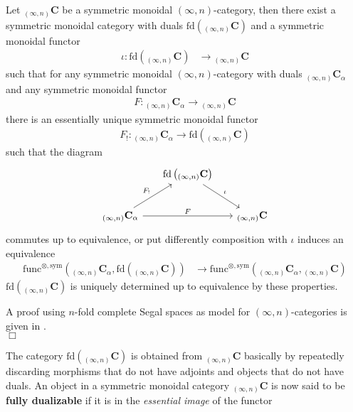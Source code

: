 \begin{thm}
\label{thm:fdsubcat}
Let ${_{(\infty,n)}}\mathbf{C}$ be a symmetric monoidal $(\infty,n)$-category, then there exist a symmetric monoidal category with duals $\textrm{fd}({_{(\infty,n)}}\mathbf{C})$ and a symmetric monoidal functor
\begin{align*}
  \iota
  \colon
  \textrm{fd}({_{(\infty,n)}}\mathbf{C})
  &\to
  {_{(\infty,n)}}\mathbf{C}
\end{align*}
such that for any symmetric monoidal $(\infty,n)$-category with duals ${_{(\infty,n)}}\mathbf{C}_{\alpha}$ and any symmetric monoidal functor
\begin{align*}
  F
  \colon
  {_{(\infty,n)}}\mathbf{C}_{\alpha}
  \to
  {_{(\infty,n)}}\mathbf{C}
\end{align*}
there is an essentially unique symmetric monoidal functor
\begin{align*}
  F_{!}
  \colon
  {_{(\infty,n)}}\mathbf{C}_{\alpha}
  \to
  \textrm{fd}
  \left(
    {_{(\infty,n)}}\mathbf{C}
  \right)
\end{align*}
such that the diagram
\begin{equation*}
\begin{tikzcd}[row sep=2.4em,column sep=1.6em]
  &
  \textrm{fd}
  \left(
    {_{(\infty,n)}}\mathbf{C}
  \right)
  \ar{rd}{\iota}
  &
  \\
  {_{(\infty,n)}}\mathbf{C}_{\alpha}
  \ar{ur}{F_{!}}
  \ar{rr}{F}
  &
  &
  {_{(\infty,n)}}\mathbf{C}
\end{tikzcd}
\end{equation*}
commutes up to equivalence, or put differently composition with $\iota$ induces an equivalence
\begin{align*}
  \mathrm{func}^{\otimes,\mathrm{sym}}
  \left(
    {_{(\infty,n)}}\mathbf{C}_{\alpha}
    ,
    \textrm{fd}
    \left(
      {_{(\infty,n)}}\mathbf{C}
    \right)
  \right)
  &\to
  \mathrm{func}^{\otimes,\mathrm{sym}}
  \left(
    {_{(\infty,n)}}\mathbf{C}_{\alpha}
    ,
    {_{(\infty,n)}}\mathbf{C}
  \right)
\end{align*}
$\textrm{fd}({_{(\infty,n)}}\mathbf{C})$ is uniquely determined up to equivalence by these properties.
\end{thm}
\begin{prf}
A proof using $n$-fold complete Segal spaces as model for $(\infty,n)$-categories is given in \cite{47e8603a}.
\\
\phantom{proven}
\hfill
$\Box$
\end{prf}
The category $\textrm{fd}({_{(\infty,n)}}\mathbf{C})$ is obtained from ${_{(\infty,n)}}\mathbf{C}$ basically by repeatedly discarding morphisms that do not have adjoints and objects that do not have duals. An object in a symmetric monoidal category ${_{(\infty,n)}}\mathbf{C}$ is now said to be \textbf{fully dualizable} if it is in the \textit{essential image} of the functor
